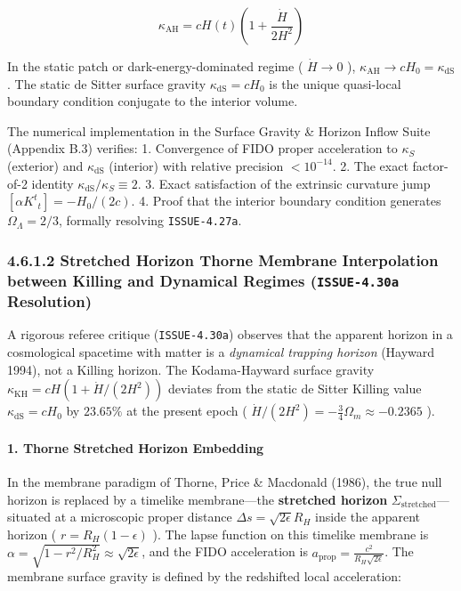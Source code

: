 \documentclass[11pt,a4paper]{article}
\theoremstyle{definition}\newtheorem{definition}{Definition}
\theoremstyle{remark}\newtheorem{remark}{Remark}
\begin{document}
\begin{equation}
\kappa_{\text{AH}} = c H(t) \left(1 + \frac{\dot{H}}{2 H^2}\right)
\end{equation}


In the static patch or dark-energy-dominated regime ( $\dot{H} \to 0$ ), $\kappa_{\text{AH}} \to c H_0 = \kappa_{\text{dS}}$. The static de Sitter surface gravity $\kappa_{\text{dS}} = c H_0$ is the unique quasi-local boundary condition conjugate to the interior volume.

The numerical implementation in the Surface Gravity \& Horizon Inflow Suite (Appendix B.3) verifies:
1. Convergence of FIDO proper acceleration to $\kappa_S$ (exterior) and $\kappa_{\text{dS}}$ (interior) with relative precision $< 10^{-14}$.
2. The exact factor-of-2 identity $\kappa_{\text{dS}} / \kappa_S \equiv 2$.
3. Exact satisfaction of the extrinsic curvature jump $[\alpha K^t{}_t] = -H_0 / (2c)$.
4. Proof that the interior boundary condition generates $\Omega_\Lambda = 2/3$, formally resolving \texttt{ISSUE-4.27a}.
\subsubsection{4.6.1.2 Stretched Horizon Thorne Membrane Interpolation between Killing and Dynamical Regimes (\texttt{ISSUE-4.30a} Resolution)}

A rigorous referee critique (\texttt{ISSUE-4.30a}) observes that the apparent horizon in a cosmological spacetime with matter is a \textit{dynamical trapping horizon} (Hayward 1994), not a Killing horizon. The Kodama-Hayward surface gravity $\kappa_{\text{KH}} = c H (1 + \dot{H}/(2H^2))$ deviates from the static de Sitter Killing value $\kappa_{\text{dS}} = c H_0$ by $23.65\%$ at the present epoch ( $\dot{H}/(2H^2) = -\frac{3}{4}\Omega_m \approx -0.2365$ ).
\paragraph{1. Thorne Stretched Horizon Embedding}

In the membrane paradigm of Thorne, Price \& Macdonald (1986), the true null horizon is replaced by a timelike membrane—the \textbf{stretched horizon} $\Sigma_{\text{stretched}}$—situated at a microscopic proper distance $\Delta s = \sqrt{2\epsilon} R_H$ inside the apparent horizon ( $r = R_H(1 - \epsilon)$ ).
The lapse function on this timelike membrane is $\alpha = \sqrt{1 - r^2/R_H^2} \approx \sqrt{2\epsilon}$, and the FIDO acceleration is $a_{\text{prop}} = \frac{c^2}{R_H \sqrt{2\epsilon}}$.
The membrane surface gravity is defined by the redshifted local acceleration:
\end{document}
